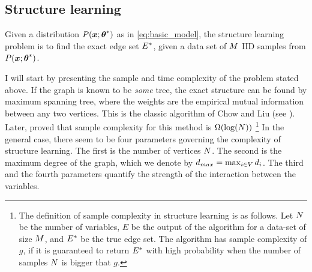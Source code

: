 \subsection{Structure learning}
\label{sec:structure}
Given a distribution $P(\boldsymbol{x};{\boldsymbol{\theta}}^{*})$ as in \eqref{eq:basic_model},
the structure learning problem is to find the exact edge set ${E}^{*}$, given a data set of $M$ IID samples from $P(\boldsymbol{x};{\boldsymbol{\theta}}^{*})$.

I will start by presenting the sample and time complexity of the problem stated above. 
If the graph is known to be {\em some} tree, the exact structure can be found by maximum spanning tree, where the weights are the empirical mutual information between any two vertices. This is the classic algorithm of Chow and Liu (see \cite{chowLiu}). Later, \cite{tan2011large} proved that sample complexity for this method is $\Omega(\log({N}))$%
\footnote{The definition of sample complexity in structure learning is as follows. Let $N$ be the number of variables, $E$ be the output of the algorithm for a data-set of size $M$, and ${E}^{*}$ be the true edge set. The algorithm has sample complexity of $g$, if it is guaranteed to return ${E}^{*}$ with high probability when the number of samples $N$ is bigger that $g$.}
In the general case, there seem to be four parameters governing the complexity of structure learning.
The first is the number of vertices $N$.
The second is the maximum degree of the graph, which we denote by $d_{max} = \max_{i \in V} d_i$.
The third and the fourth parameters quantify the strength of the interaction between the variables.

